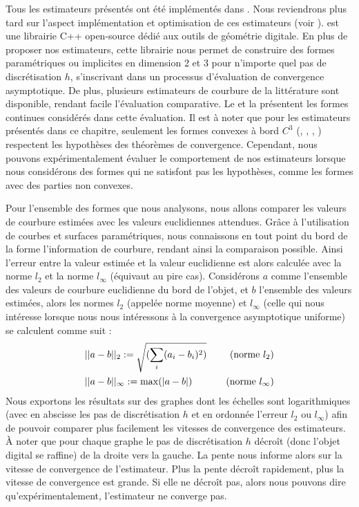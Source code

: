 Tous les estimateurs présentés ont été implémentés dans \DGtal \cite{DGtal}.
Nous reviendrons plus tard sur l'aspect implémentation et optimisation de ces
estimateurs (voir ). \DGtal est une librairie
C++ open-source dédié aux outils de géométrie digitale. En plus de proposer nos
estimateurs, cette librairie nous permet de construire des formes paramétriques
ou implicites en dimension 2 et 3 pour n'importe quel pas de discrétisation $h$,
s'inscrivant dans un processus d'évaluation de convergence asymptotique. De
plus, plusieurs estimateurs de courbure de la littérature sont disponible,
rendant facile l'évaluation comparative. Le  et la
 présentent les formes continues considérés
dans cette évaluation. Il est à noter que pour les estimateurs présentés dans ce
chapitre, seulement les formes convexes à bord $C^3$ (\Ellipse, \Sphere,
\RoundedCube, \Ellipsoid) respectent les hypothèses des théorèmes de
convergence. Cependant, nous pouvons expérimentalement évaluer le comportement
de nos estimateurs lorsque nous considérons des formes qui ne satisfont pas les
hypothèses, comme les formes avec des parties non convexes.


Pour l'ensemble des formes que nous analysons, nous allons comparer les valeurs
de courbure estimées avec les valeurs euclidiennes attendues. Grâce à
l'utilisation de courbes et surfaces paramétriques, nous connaissons en tout
point du bord de la forme l'information de courbure, rendant ainsi la
comparaison possible. Ainsi l'erreur entre la valeur estimée et la valeur
euclidienne est alors calculée avec la norme $l_2$ et la norme $l_\infty$
(équivaut au pire cas).
%
Considérons $a$ comme l'ensemble des valeurs de courbure euclidienne du bord de
l'objet, et $b$ l'ensemble des valeurs estimées, alors les normes $l_2$ (appelée
norme moyenne) et $l_\infty$ (celle qui nous intéresse lorsque nous nous
intéressons à la convergence asymptotique uniforme) se calculent comme suit :
%
\begin{align}
  &|| a - b ||_2 := \sqrt{(\sum_i(a_i - b_i)^2)} \quad &\text{(norme $l_2$)} \\
  &|| a - b ||_\infty := \max(|a - b|) \quad &\text{(norme $l_\infty$)}
\end{align}
%
Nous exportons les résultats sur des graphes dont les échelles sont
logarithmiques (avec en abscisse les pas de discrétisation $h$ et en ordonnée
l'erreur $l_2$ ou $l_\infty$) afin de pouvoir comparer plus facilement les
vitesses de convergence des estimateurs. À noter que pour chaque graphe le pas
de discrétisation $h$ décroît (donc l'objet digital se raffine) de la droite
vers la gauche. La pente nous informe alors sur la vitesse de convergence de
l'estimateur. Plus la pente décroît rapidement, plus la vitesse de convergence
est grande. Si elle ne décroît pas, alors nous pouvons dire
qu'expérimentalement, l'estimateur ne converge pas.
%
